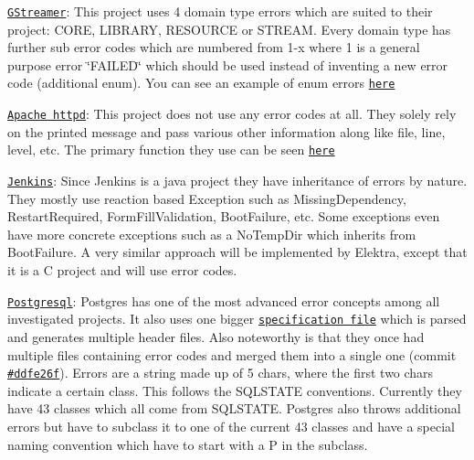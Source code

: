 \begin{DoxyItemize}
\item \href{https://github.com/GStreamer/gstreamer}{\tt G\+Streamer}\+: This project uses 4 domain type errors which are suited to their project\+: C\+O\+RE, L\+I\+B\+R\+A\+RY, R\+E\+S\+O\+U\+R\+CE or S\+T\+R\+E\+AM. Every domain type has further sub error codes which are numbered from 1-\/x where 1 is a general purpose error \char`\"{}\+F\+A\+I\+L\+E\+D\char`\"{} which should be used instead of inventing a new error code (additional enum). You can see an example of enum errors \href{https://github.com/GStreamer/gstreamer/blob/a7db80f9a98287f012108845e121f6f6fb62171b/gst/gsterror.h#L63-L80}{\tt here}
\item \href{https://github.com/apache/httpd}{\tt Apache httpd}\+: This project does not use any error codes at all. They solely rely on the printed message and pass various other information along like file, line, level, etc. The primary function they use can be seen \href{https://github.com/apache/httpd/blob/1acebd4933e5315c669605c3c9222ed8bb0ee9ea/include/http_log.h#L378-L403}{\tt here}
\item \href{https://github.com/jenkinsci/jenkins}{\tt Jenkins}\+: Since Jenkins is a java project they have inheritance of errors by nature. They mostly use reaction based Exception such as {\ttfamily Missing\+Dependency}, {\ttfamily Restart\+Required}, {\ttfamily Form\+Fill\+Validation}, {\ttfamily Boot\+Failure}, etc. Some exceptions even have more concrete exceptions such as a {\ttfamily No\+Temp\+Dir} which inherits from {\ttfamily Boot\+Failure}. A very similar approach will be implemented by Elektra, except that it is a C project and will use error codes.
\item \href{https://github.com/postgres/postgres}{\tt Postgresql}\+: Postgres has one of the most advanced error concepts among all investigated projects. It also uses one bigger \href{https://github.com/postgres/postgres/blob/master/src/backend/utils/errcodes.txt}{\tt specification file} which is parsed and generates multiple header files. Also noteworthy is that they once had multiple files containing error codes and merged them into a single one (commit \href{https://github.com/postgres/postgres/commit/ddfe26f6441c24660595c5efe5fd0bd3974cdc5c}{\tt \#ddfe26f}). Errors are a string made up of 5 chars, where the first two chars indicate a certain class. This follows the S\+Q\+L\+S\+T\+A\+TE conventions. Currently they have 43 classes which all come from S\+Q\+L\+S\+T\+A\+TE. Postgres also throws additional errors but have to subclass it to one of the current 43 classes and have a special naming convention which have to start with a {\ttfamily P} in the subclass.

\end{DoxyItemize}
